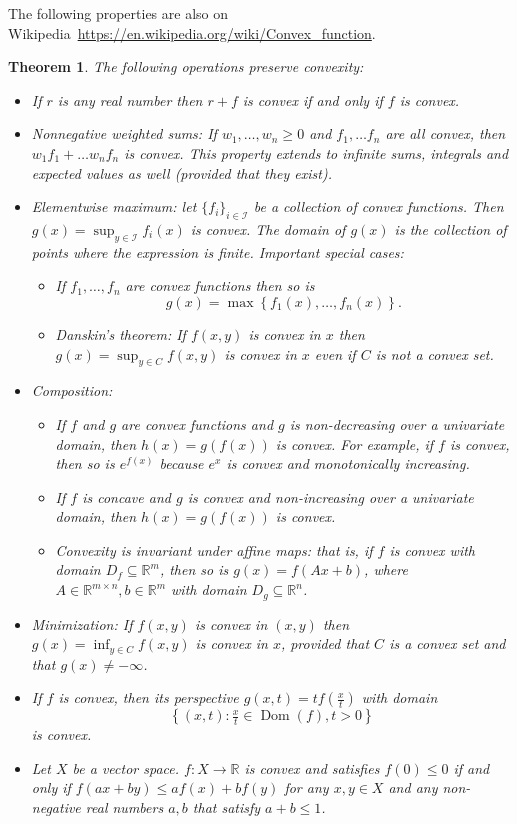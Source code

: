 \documentclass{article}
\newtheorem{theorem}{Theorem}[section]
\begin{document}
The following properties are also on Wikipedia~\url{https://en.wikipedia.org/wiki/Convex_function}.
\begin{theorem}
The following operations preserve convexity:
\begin{itemize}
	\item If $r$ is any real number then $r+f$ is convex if and only if $f$ is convex.
	\item Nonnegative weighted sums: If $w_1, \dots, w_n\geq 0$ and $f_1, \dots f_n$ are all convex, then $w_1f_1 + \dots w_n f_n$ is convex. This property extends to infinite sums, integrals and expected values as well (provided that they exist).
	\item Elementwise maximum: let $\{f_i\}_{i\in\mathcal{I}}$ be a collection of convex functions. Then $g(x) = \sup_{y\in\mathcal{I}}f_i(x)$ is convex.   The domain of $g(x)$ is the collection of points where the expression is finite. Important special cases:
		\begin{itemize}
			\item If $f_{1},\ldots ,f_{n}$ are convex functions then so is 
				\[ 
				g(x)=\max \left\{ f_{1}(x), \ldots, f_{n}(x) \right\}.
				\]
			\item Danskin's theorem: If $f(x,y)$ is convex in $x$ then $g(x)=\sup \nolimits _{y\in C}f(x,y)$ is convex in $x$ even if $C$ is not a convex set.
		\end{itemize}
	\item Composition: 
		\begin{itemize} 
			\item If $f$  and $g$ are convex functions and $g$ is non-decreasing over a univariate domain, then $h(x)=g(f(x))$ is convex. For example, if $f$ is convex, then so is $e^{f(x)}$ because $e^{x}$ is convex and monotonically increasing.
			\item If $f$ is concave and $g$ is convex and non-increasing over a univariate domain, then $h(x)=g(f(x))$ is convex.
			\item Convexity is invariant under affine maps: that is, if $f$ is convex with domain $D_{f}\subseteq \mathbb{R}^{m}$, then so is $g(x)=f(Ax+b)$, where $A\in \mathbb{R}^{m\times n}, b\in \mathbb{R}^{m}$ with domain $D_{g}\subseteq \mathbb{R}^{n}$.
		\end{itemize}
	\item Minimization: If $f(x,y)$ is convex in $(x,y)$ then $g(x)=\inf \nolimits _{y\in C}f(x,y)$ is convex in $x$, provided that $C$ is a convex set and that $g(x)\neq -\infty$.
	\item If $f$ is convex, then its perspective 
		\(
		g(x,t)=tf\left({\tfrac {x}{t}}\right)
		\) with domain 
		\[
		\left\{(x,t):{\tfrac {x}{t}}\in \operatorname {Dom} (f),t>0\right\}
		\]  is convex.
	\item Let $X$ be a vector space. $f:X\to \mathbb{R}$ is convex and satisfies $f(0)\leq 0$ if and only if $f(ax+by)\leq af(x)+bf(y)$ for any $x, y \in X$ and any non-negative real numbers $a,b$ that satisfy $a+b\leq 1$.	
 	
\end{itemize}

\end{theorem}
\end{document}
